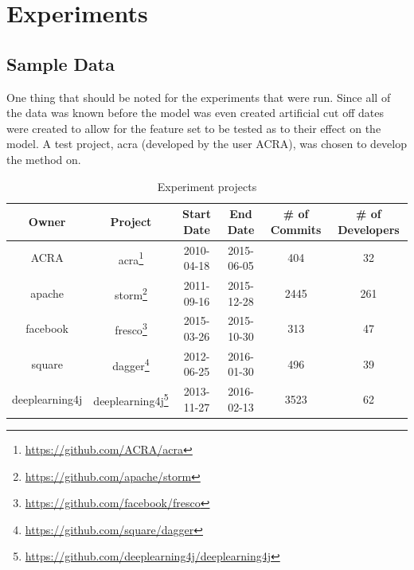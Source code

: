 \chapter{Experiments}
\label{chap:experiments}

\section{Sample Data}
\label{sec:sample_data}


One thing that should be noted for the experiments that were run. Since all of the data was known before the model was even created artificial cut off dates were created to allow for the feature set to be tested as to their effect on the model. A test project, acra (developed by the user ACRA), was chosen to develop the method on. 


\begin{table}
\begin{minipage}{\textwidth}
\begin{center}
    \begin{tabular}{|c|c|c|c|c|c|}
        \hline
        Owner & Project & Start Date & End Date & \# of Commits & \# of Developers \\
        \hline
        ACRA & acra\footnote{\url{https://github.com/ACRA/acra}} & 2010-04-18 & 2015-06-05 & 404 & 32 \\
        apache & storm\footnote{\url{https://github.com/apache/storm}} & 2011-09-16 & 2015-12-28 & 2445 & 261 \\
        facebook & fresco\footnote{\url{https://github.com/facebook/fresco}} & 2015-03-26 & 2015-10-30 & 313 & 47 \\
        square & dagger\footnote{\url{https://github.com/square/dagger}} & 2012-06-25 & 2016-01-30 & 496 & 39 \\
        deeplearning4j & deeplearning4j\footnote{\url{https://github.com/deeplearning4j/deeplearning4j}} & 2013-11-27 & 2016-02-13 & 3523 & 62 \\
        \hline
    \end{tabular}
\end{center}
\caption{Experiment projects}
\label{tab:project_summary}
\end{minipage}
\end{table}


